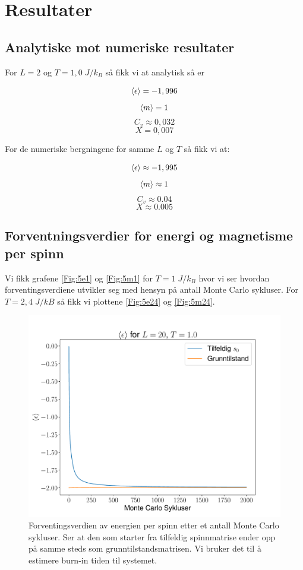 \documentclass[reprint,english,notitlepage]{revtex4-2}  %
\begin{document}
\section{Resultater}

\subsection*{Analytiske mot numeriske resultater}

For $L = 2$ og $T = 1,0 \; J/k_B$ så fikk vi at analytisk så er

$$ \expval{\epsilon} = -1,996 $$
$$ \expval{m} =  1 $$
$$ C_v  \approx 0,032 $$
$$ X = 0,007$$

For de numeriske bergningene for samme $L$ og $T$ så fikk vi at:

$$ \expval{\epsilon} \approx -1,995 $$
$$ \expval{m} \approx 1$$
$$ C_v \approx 0.04$$
$$ X \approx 0.005$$


\subsection*{Forventningsverdier for energi og magnetisme per spinn}

Vi fikk grafene \autoref{Fig:5e1} og \autoref{Fig:5m1} for $T =  1 \; J/k_B $ hvor vi ser hvordan forventingsverdiene utvikler seg med hensyn på antall Monte Carlo sykluser. For $T = 2,4 \; J/kB$ så fikk vi plottene \autoref{Fig:5e24} og \autoref{Fig:5m24}.

\begin{figure}[H]
\centering
\includegraphics[scale=0.4, trim=1.7cm 0 0 0 ]{../Images/meanepsT1L20.pdf}
\caption{Forventingsverdien av energien per spinn etter et antall Monte Carlo sykluser. Ser at den som starter fra tilfeldig spinnmatrise ender opp på samme steds som grunntilstandsmatrisen. Vi bruker det til å estimere burn-in tiden til systemet.}
\label{Fig:5e1}
\end{figure}
\end{document}
